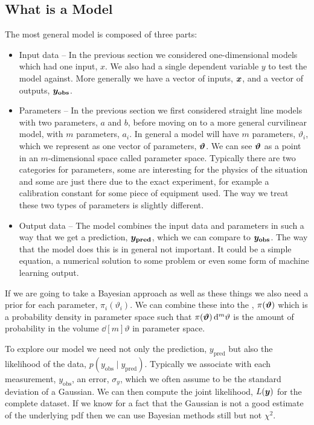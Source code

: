 \documentclass[a4paper]{article}
\newcommand{\st}{\mid}
\begin{document}
    \subsection{What is a Model}
    The most general model is composed of three parts:
    \begin{itemize}
        \item Input data -- In the previous section we considered one-dimensional models which had one input, \(x\).
        We also had a single dependent variable \(y\) to test the model against.
        More generally we have a vector of inputs, \(\bm{x}\), and a vector of outputs, \(\bm{y_{\mathrm{obs}}}\).
        \item Parameters -- In the previous section we first considered straight line models with two parameters, \(a\) and \(b\), before moving on to a more general curvilinear model, with \(m\) parameters, \(a_i\).
        In general a model will have \(m\) parameters, \(\vartheta_i\), which we represent as one vector of parameters, \(\bm{\vartheta}\).
        We can see \(\bm{\vartheta}\) as a point in an \(m\)-dimensional space called parameter space.
        Typically there are two categories for parameters, some are interesting for the physics of the situation and some are just there due to the exact experiment, for example a calibration constant for some piece of equipment used.
        The way we treat these two types of parameters is slightly different.
        \item Output data -- The model combines the input data and parameters in such a way that we get a prediction, \(\bm{y_{\mathrm{pred}}}\), which we can compare to \(\bm{y_{\mathrm{obs}}}\).
        The way that the model does this is in general not important.
        It could be a simple equation, a numerical solution to some problem or even some form of machine learning output.
    \end{itemize}
    If we are going to take a Bayesian approach as well as these things we also need a prior for each parameter, \(\pi_i(\vartheta_i)\).
    We can combine these into the , \(\pi(\bm{\vartheta})\) which is a probability density in parameter space such that \(\pi(\bm{\vartheta})\dd[m]{\vartheta}\) is the amount of probability in the volume \(\dd[m]{\vartheta}\) in parameter space.
    
    To explore our model we need not only the prediction, \(y_{\mathrm{pred}}\) but also the likelihood of the data, \(p(y_{\mathrm{obs}}\st y_{\mathrm{pred}})\).
    Typically we associate with each measurement, \(y_{\mathrm{obs}}\), an error, \(\sigma_y\), which we often assume to be the standard deviation of a Gaussian.
    We can then compute the joint likelihood, \(L(\bm{y})\) for the complete dataset.
    If we know for a fact that the Gaussian is not a good estimate of the underlying \gls{pdf} then we can use Bayesian methods still but not \(\chi^2\).
    
\end{document}
